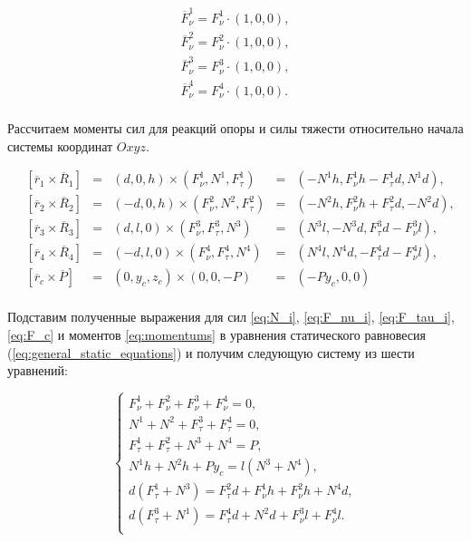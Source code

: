 \begin{equation}
\label{eq:F_nu_i}
  \begin{alignedat}{1}
  \overline{F}_\nu^1 = F_\nu^1\cdot(1,0,0), \\
  \overline{F}_\nu^2 = F_\nu^2\cdot(1,0,0), \\
  \overline{F}_\nu^3 = F_\nu^3\cdot(1,0,0), \\
  \overline{F}_\nu^4 = F_\nu^4\cdot(1,0,0). \\
  \end{alignedat}
\end{equation}

Рассчитаем моменты сил для реакций опоры и силы тяжести относительно начала системы координат $Oxyz$.

\begin{equation}
\label{eq:momentums}
  \begin{alignedat}{3}
    &[\overline{r}_1\times\overline{R}_1] &=&  (d,0,h)\times(F_\nu^1, N^1, F_\tau^1) &=& (-N^1h,F_\nu^1h - F_\tau^1d,N^1d),  \\
    &[\overline{r}_2\times\overline{R}_2] &=& (-d,0,h)\times(F_\nu^2, N^2, F_\tau^2) &=& (-N^2h,F_\nu^2h + F_\tau^2d,-N^2d), \\
    &[\overline{r}_3\times\overline{R}_3] &=&  (d,l,0)\times(F_\nu^3, F_\tau^3, N^3) &=& (N^3l,-N^3d, F_\tau^3d-F_\nu^3l), \\
    &[\overline{r}_4\times\overline{R}_4] &=& (-d,l,0)\times(F_\nu^4, F_\tau^4, N^4) &=& (N^4l, N^4d,-F_\tau^4d-F_\nu^4l),\\
    &[\overline{r}_c\times\overline{P}]   &=&  (0, y_c, z_c)\times(0,0,-P) &=& (-Py_c,0,0)\\
  \end{alignedat}
\end{equation}

Подставим полученные выражения для сил \ref{eq:N_i}, \ref{eq:F_nu_i}, \ref{eq:F_tau_i}, \ref{eq:F_c} и моментов \ref{eq:momentums} в уравнения статического равновесия (\ref{eq:general_static_equations}) и получим следующую систему из шести уравнений:

\begin{equation}
  \label{eq:case1_initial}
  \left\{
    \begin{alignedat}{3}  
      F_\nu^1 + F_\nu^2 + F_\nu^3 + F_\nu^4 = 0, \\
      N^1 + N^2 + F_\tau^3 + F_\tau^4 = 0, \\
      F_\tau^1 + F_\tau^2 + N^3 + N^4 = P, \\
      N^1h + N^2h + Py_c = l(N^3 + N^4), \\
      d(F_\tau^1 + N^3) = F_\tau^2d + F_\nu^1h + F_\nu^2h + N^4d, \\
      d(F_\tau^3 + N^1) = F_\tau^4d + N^2d +F_\nu^3l + F_\nu^4l.\\
    \end{alignedat}
  \right.
\end{equation}



